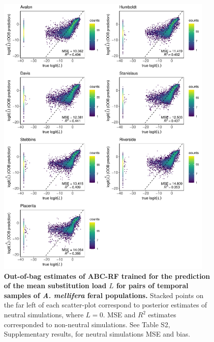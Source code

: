 \documentclass[a4paper, 12pt]{article}
\begin{document}
\begin{figure}[ht]
  \centering
  \includegraphics[width=0.95\textwidth]{Figures/FigureS21_combined_plot_load.pdf}
  \small\caption{\textbf{Out-of-bag estimates of ABC-RF trained for the prediction of the mean substitution load $L$ for pairs of temporal samples of \textit{A. mellifera} feral populations.} Stacked points on the far left of each scatter-plot correspond to posterior estimates of neutral simulations, where $L = 0$. MSE and $R^2$ estimates corresponded to non-neutral simulations. See Table S2, Supplementary results, for neutral simulations MSE and bias.}
  \label{fig:supple_feralbee_load}
\end{figure}
\end{document}

